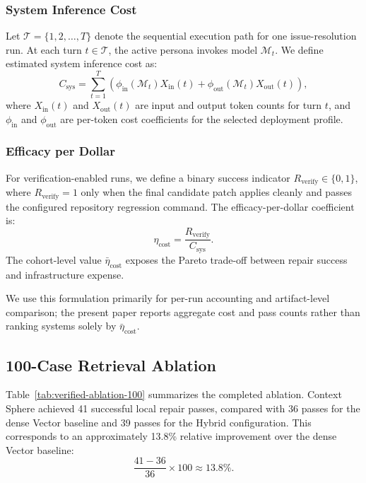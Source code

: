 \subsubsection{System Inference Cost}
Let \(\mathcal{T}=\{1,2,\dots,T\}\) denote the sequential execution path for one issue-resolution run. At each turn \(t \in \mathcal{T}\), the active persona invokes model \(\mathcal{M}_t\). We define estimated system inference cost as:
\begin{equation}
    C_{\mathrm{sys}} = \sum_{t=1}^{T}
    \left(
        \phi_{\mathrm{in}}(\mathcal{M}_t) X_{\mathrm{in}}(t)
        + \phi_{\mathrm{out}}(\mathcal{M}_t) X_{\mathrm{out}}(t)
    \right),
\end{equation}
where \(X_{\mathrm{in}}(t)\) and \(X_{\mathrm{out}}(t)\) are input and output token counts for turn \(t\), and \(\phi_{\mathrm{in}}\) and \(\phi_{\mathrm{out}}\) are per-token cost coefficients for the selected deployment profile.

\subsubsection{Efficacy per Dollar}
For verification-enabled runs, we define a binary success indicator \(R_{\mathrm{verify}}\in\{0,1\}\), where \(R_{\mathrm{verify}}=1\) only when the final candidate patch applies cleanly and passes the configured repository regression command. The efficacy-per-dollar coefficient is:
\begin{equation}
    \eta_{\mathrm{cost}} = \frac{R_{\mathrm{verify}}}{C_{\mathrm{sys}}}.
\end{equation}
The cohort-level value \(\bar{\eta}_{\mathrm{cost}}\) exposes the Pareto trade-off between repair success and infrastructure expense.

We use this formulation primarily for per-run accounting and artifact-level comparison; the present paper reports aggregate cost and pass counts rather than ranking systems solely by \(\bar{\eta}_{\mathrm{cost}}\).

\subsection{100-Case Retrieval Ablation}

Table~\ref{tab:verified-ablation-100} summarizes the completed ablation. Context Sphere achieved 41 successful local repair passes, compared with 36 passes for the dense Vector baseline and 39 passes for the Hybrid configuration. This corresponds to an approximately 13.8\% relative improvement over the dense Vector baseline:
\begin{equation}
    \frac{41 - 36}{36} \times 100 \approx 13.8\%.
\end{equation}

